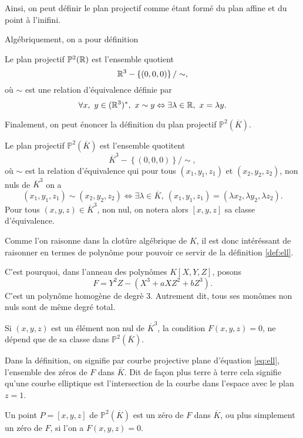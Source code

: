 Ainsi, on peut définir le plan projectif comme étant formé du plan affine et du point à
l'inifini.

Algébriquement, on a pour définition

\begin{definition}
    Le plan projectif $\mathbb{P}^2(\mathbb{R})$ est l'ensemble quotient
    \[
    \mathbb{R}^3 - \left\{ (0,0,0) \right\} / \sim
    ,\] 
    où $\sim$ est une relation d'équivalence définie par
    \[
    \forall x,\ y \in (\mathbb{R}^3)^{*},\ x \sim y \Leftrightarrow \exists \lambda \in \mathbb{R},\ x=\lambda y
    .\] 
\end{definition}

Finalement, on peut énoncer la définition du plan projectif $\mathbb{P}^2(\overline{K})$.

\begin{definition}
    Le plan projectif $\mathbb{P}^2(\overline{K})$ est l'ensemble quotitent
    \[
    \overline{K}^3 - \left\{ (0,0,0) \right\} / \sim
    ,\] 
    où $\sim$ est la relation d'équivalence qui pour tous $(x_1,y_1,z_1)$ et
    $(x_2,y_2,z_2)$, non nuls de $\overline{K}^3$ on a
    \[
        (x_1,y_1,z_1) \sim (x_2,y_2,z_2) \iff \exists \lambda \in \overline{K},\
        (x_1,y_1,z_1)=(\lambda x_2, \lambda y_2, \lambda z_2)
    .\] 
    Pour tous $(x,y,z) \in \overline{K}^3$, non nul, on notera alors $\left[ x,y,z \right] $ sa
    classe d'équivalence.
\end{definition}

Comme l'on raisonne dans la clotûre algébrique de $K$, il est donc intéréssant de raisonner en
termes de polynôme pour pouvoir ce servir de la définition \ref{def:ell}.

C'est pourquoi, dans l'anneau des polynômes $K\left[ X,Y,Z \right] $, posons 
\[
F=Y^2Z-\left( X^3+aXZ^2+bZ^3 \right) 
.\] 
C'est un polynôme homogène de degrè $3$. Autrement dit, tous ses monômes non nuls sont de même degré total.

Si $(x,y,z)$ est un élément non nul de $\overline{K}^3$, la condition $F(x,y,z)=0$, ne dépend que de sa classe dans $\mathbb{P}^2(\overline{K})$.

\begin{remarque}
    Dans la définition, on signifie par courbe projective plane d'équation \eqref{eq:ell}, l'ensemble des zéros de $F$ dans $\overline{K}$. Dit de façon plus terre à terre cela signifie qu'une courbe elliptique est l'intersection de la courbe dans l'espace avec le plan $z=1$. 

    Un point $P=\left[ x,y,z \right] $ de $\mathbb{P}^2(\overline{K})$ est un zéro de $F$ dans $\overline{K}$, ou plus simplement un zéro de $F$, si l'on a $F(x,y,z)=0$.
\end{remarque}

